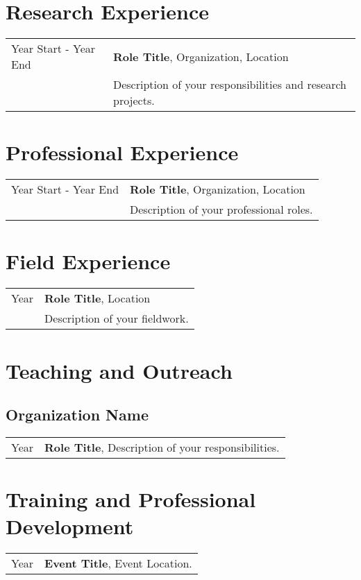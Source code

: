 \section{Research Experience}
\begin{tabularx}{\textwidth}{>{\raggedright\arraybackslash}p{2.5cm} X}
Year Start - Year End & \textbf{Role Title}, Organization, Location \\
                      & Description of your responsibilities and research projects.
\end{tabularx}

\section{Professional Experience}
\begin{tabularx}{\textwidth}{>{\raggedright\arraybackslash}p{2.5cm} X}
Year Start - Year End & \textbf{Role Title}, Organization, Location \\
                      & Description of your professional roles.
\end{tabularx}

\section{Field Experience}
\begin{tabularx}{\textwidth}{>{\raggedright\arraybackslash}p{1cm} X}
Year & \textbf{Role Title}, Location \\
     & Description of your fieldwork.
\end{tabularx}

\section{Teaching and Outreach}
\subsection*{Organization Name}
\begin{tabularx}{\textwidth}{>{\raggedright\arraybackslash}p{2.5cm} X}
Year & \textbf{Role Title}, Description of your responsibilities.
\end{tabularx}

\section{Training and Professional Development}
\begin{tabularx}{\textwidth}{>{\raggedright\arraybackslash}p{1cm} X}
Year & \textbf{Event Title}, Event Location.
\end{tabularx}


